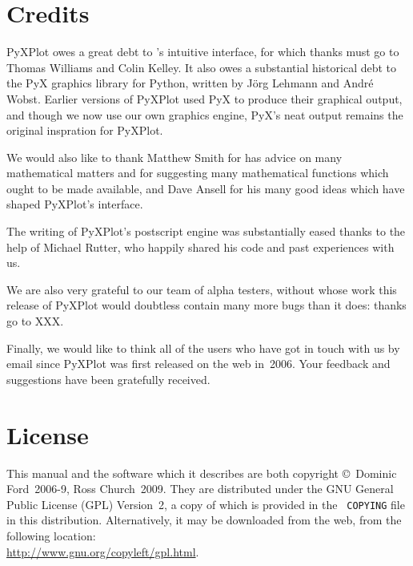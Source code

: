 \section{Credits}

PyXPlot owes a great debt to \gnuplot's intuitive interface, for which thanks
must go to Thomas Williams and Colin Kelley.  It also owes a substantial
historical debt to the PyX graphics library for Python, written by
J\"org Lehmann and Andr\'e Wobst.
Earlier versions of PyXPlot used PyX to produce their graphical output, and
though we now use our own graphics engine, PyX's neat output remains the
original inspration for PyXPlot.

We would also like to thank Matthew Smith for has advice on many mathematical
matters and for suggesting many mathematical functions which ought to be made
available, and Dave Ansell for his many good ideas which have shaped PyXPlot's
interface.

The writing of PyXPlot's postscript engine was substantially eased thanks to
the help of Michael Rutter, who happily shared his code and past experiences
with us.

We are also very grateful to our team of alpha testers, without whose work this
release of PyXPlot would doubtless contain many more bugs than it does: thanks
go to XXX.

Finally, we would like to think all of the users who have got in touch with us
by email since PyXPlot was first released on the web in~2006. Your feedback and
suggestions have been gratefully received.

\section{License}

This manual and the software which it describes are both copyright \copyright\
Dominic Ford~2006-9, Ross Church~2009. They are distributed under the GNU
General Public License (GPL) Version~2, a copy of which is provided in the {\tt
COPYING} file in this distribution. Alternatively, it may be downloaded from the web, from
the following location:\\ \url{http://www.gnu.org/copyleft/gpl.html}.

